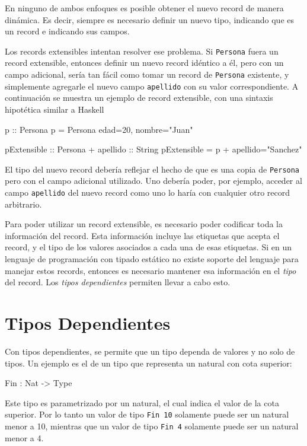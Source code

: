 En ninguno de ambos enfoques es posible obtener el nuevo record de manera dinámica. Es decir, siempre es necesario definir un nuevo tipo, indicando que es un record e indicando sus campos.

Los records extensibles intentan resolver ese problema. Si \texttt{Persona} fuera un record extensible, entonces definir un nuevo record idéntico a él, pero con un campo adicional, sería tan fácil como tomar un record de \texttt{Persona} existente, y simplemente agregarle el nuevo campo \texttt{apellido} con su valor correspondiente. A continuación se muestra un ejemplo de record extensible, con una sintaxis hipotética similar a Haskell

\begin{code}
p :: Persona
p = Persona {edad=20, nombre="Juan"}

pExtensible :: Persona + {apellido :: String}
pExtensible = p + {apellido="Sanchez"}
\end{code}

El tipo del nuevo record debería reflejar el hecho de que es una copia de \texttt{Persona} pero con el campo adicional utilizado. Uno debería poder, por ejemplo, acceder al campo \texttt{apellido} del nuevo record como uno lo haría con cualquier otro record arbitrario.

Para poder utilizar un record extensible, es necesario poder codificar toda la información del record. Esta información incluye las etiquetas que acepta el record, y el tipo de los valores asociados a cada una de esas etiquetas. Si en un lenguaje de programación con tipado estático no existe soporte del lenguaje para manejar estos records, entonces es necesario mantener esa información en el \textit{tipo} del record. Los \textit{tipos dependientes} permiten llevar a cabo esto.

\section{Tipos Dependientes}

Con tipos dependientes, se permite que un tipo dependa de valores y no solo de tipos. Un ejemplo es el de un tipo que representa un natural con cota superior:
\begin{code}
Fin : Nat -> Type
\end{code}
Este tipo es parametrizado por un natural, el cual indica el valor de la cota superior. Por lo tanto un valor de tipo \texttt{Fin 10} solamente puede ser un natural menor a 10, mientras que un valor de tipo \texttt{Fin 4} solamente puede ser un natural menor a 4.

